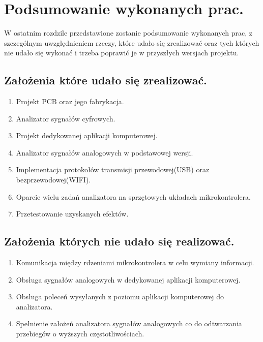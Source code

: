 \section{Podsumowanie wykonanych prac.}
W ostatnim rozdzile przedstawione zostanie podsumowanie wykonanych prac, z szczególnym uwzględnieniem rzeczy,
które udało się zrealizować oraz tych których nie udało się wykonać i trzeba poprawić je w przyszłych wersjach projektu.

\subsection{Założenia które udało się zrealizować.}
\begin{enumerate}
    \item Projekt PCB oraz jego fabrykacja.
    \item Analizator sygnałów cyfrowych.
    \item Projekt dedykowanej aplikacji komputerowej.
    \item Analizator sygnałów analogowych w podstawowej wersji.
    \item Implementacja protokołów transmisji przewodowej(USB) oraz bezprzewodowej(WIFI).
    \item Oparcie wielu zadań analizatora na sprzętowych układach mikrokontrolera.
    \item Przetestowanie uzyskanych efektów.
\end{enumerate}

\subsection{Założenia których nie udało się realizować.}
\begin{enumerate}
    \item Komunikacja między rdzeniami mikrokontrolera w celu wymiany informacji.
    \item Obsługa sygnałów analogowych w dedykowanej aplikacji komputerowej.
    \item Obsługa poleceń wysyłanych z poziomu aplikacji komputerowej do analizatora.
    \item Spełnienie założeń analizatora sygnałów analogowych co do odtwarzania przebiegów o wyższych częstotliwościach.
\end{enumerate}